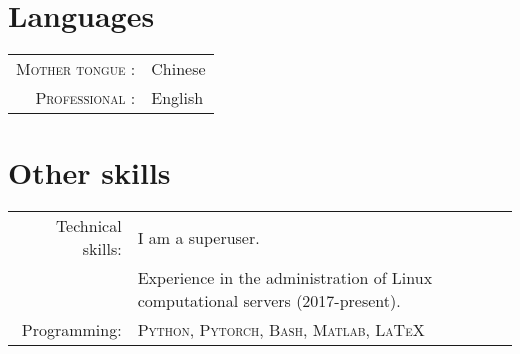 \documentclass[a4paper,10pt]{article}
\begin{document}





\vspace{-10pt}

\section{Languages}

\begin{tabular}{rp{10cm}}

  \textsc{Mother tongue :} & Chinese \\

  \textsc{Professional :} & English \\

\end{tabular}


\section{Other skills}

\begin{tabular}{rp{12cm}}
	Technical skills:  & I am a superuser. \\
                     & Experience in the administration of Linux computational servers (2017-present).
                       \vspace{5pt}\\
	Programming:       & \textsc{Python, Pytorch, Bash, Matlab, \LaTeX}  \vspace{5pt}\\
\end{tabular}
\end{document}
